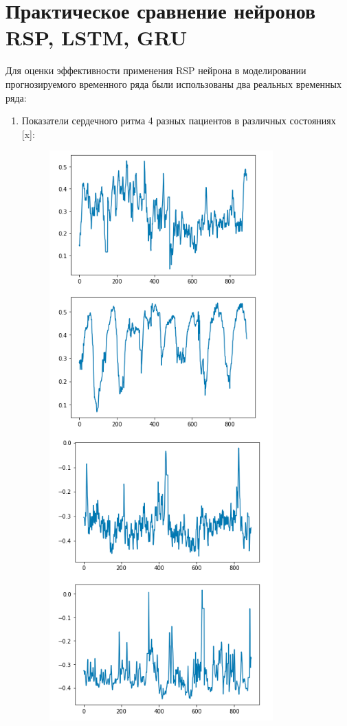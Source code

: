\documentclass[11pt]{article}
\begin{document}
\section*{Практическое сравнение нейронов RSP, LSTM, GRU}
Для оценки эффективности применения RSP нейрона в моделировании прогнозируемого временного ряда были использованы два реальных временных ряда:
\begin{enumerate}
  \item Показатели сердечного ритма 4 разных пациентов в различных состояниях [x]:
\begin{figure}[H]
\centering
\includegraphics[scale=0.5]{heart_rates_data.png}

\end{figure}
\end{enumerate}
\end{document}
